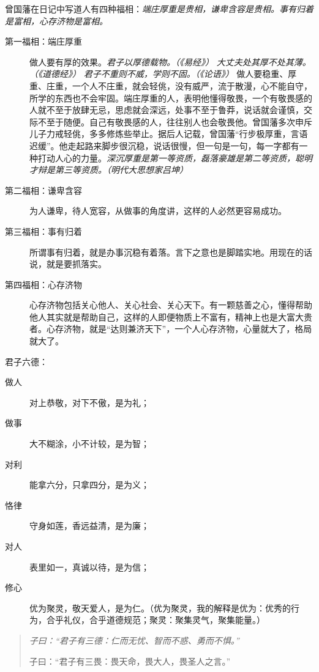 曾国藩在日记中写道人有四种福相：\textit{端庄厚重是贵相，谦卑含容是贵相。事有归着是富相，心存济物是富相。} \begin{description}
    \item[第一福相：端庄厚重] 做人要有厚的效果。\textit{君子以厚德载物。（《易经》）} \textit{大丈夫处其厚不处其薄。（《道德经》）} \textit{君子不重则不威，学则不固。（《论语》）} 做人要稳重、厚重、庄重，一个人不庄重，就会轻佻，没有威严，流于散漫，心不能自守，所学的东西也不会牢固。端庄厚重的人，表明他懂得敬畏，一个有敬畏感的人就不至于放肆无忌，思虑就会深远，处事不至于鲁莽，说话就会谨慎，交际不至于随便。自己有敬畏感的人，往往别人也会敬畏他。曾国藩多次申斥儿子力戒轻佻，多多修炼些举止。据后人记载，曾国藩“行步极厚重，言语迟缓”。他走起路来脚步很沉稳，说话很慢，但一句是一句，每一字都有一种打动人心的力量。\textit{深沉厚重是第一等资质，磊落豪雄是第二等资质，聪明才辩是第三等资质。（明代大思想家吕坤）}
    \item[第二福相：谦卑含容] 为人谦卑，待人宽容，从做事的角度讲，这样的人必然更容易成功。
    \item[第三福相：事有归着] 所谓事有归着，就是办事沉稳有着落。言下之意也是脚踏实地。用现在的话说，就是要抓落实。
    \item[第四福相：心存济物] 心存济物包括关心他人、关心社会、关心天下。有一颗慈善之心，懂得帮助他人其实就是帮助自己，这样的人即便物质上不富有，精神上也是大富大贵者。心存济物，就是“达则兼济天下”，一个人心存济物，心量就大了，格局就大了。
\end{description}

君子六德：\begin{multicols}{2}
    \begin{description}
        \item[做人] 对上恭敬，对下不傲，是为礼；
        \item[做事] 大不糊涂，小不计较，是为智；
        \item[对利] 能拿六分，只拿四分，是为义；
        \item[恪律] 守身如莲，香远益清，是为廉；
        \item[对人] 表里如一，真诚以待，是为信；
        \item[修心] 优为聚灵，敬天爱人，是为仁。（优为聚灵，我的解释是优为：优秀的行为，合乎礼仪，合乎道德规范；聚灵：聚集灵气，聚集能量。）
    \end{description}
\end{multicols}

\begin{quotation}\it
    子曰：“君子有三德：仁而无忧、智而不惑、勇而不惧。”

    子曰：“君子有三畏：畏天命，畏大人，畏圣人之言。”
\end{quotation}

